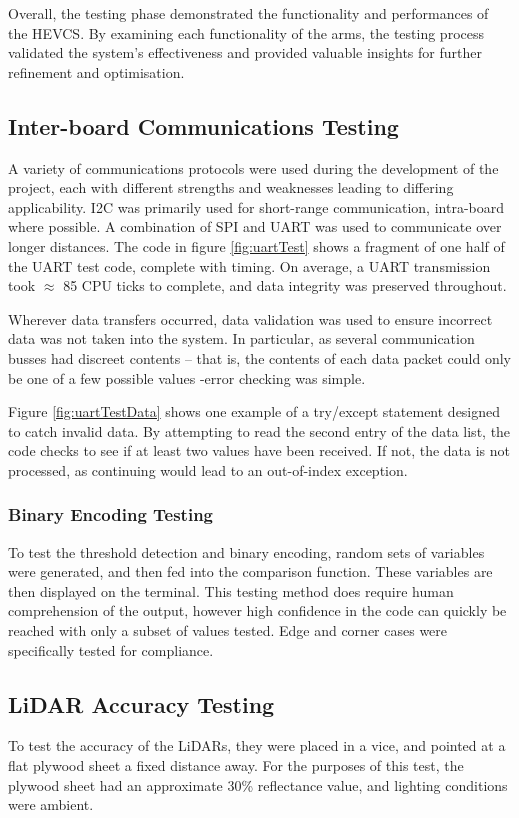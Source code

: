 \documentclass [12pt]{article}
\begin{document}
Overall, the testing phase demonstrated the functionality and performances of the HEVCS. By examining each functionality of the arms, the testing process validated the system’s effectiveness and provided valuable insights for further refinement and optimisation.


\subsection{Inter-board Communications Testing}

A variety of communications protocols were used during the development of the project, each with different strengths and weaknesses leading to differing applicability. I2C was primarily used for short-range communication, intra-board where possible. A combination of SPI and UART was used to communicate over longer distances. The code in figure \ref{fig:uartTest} shows a fragment of one half of the UART test code, complete with timing. On average, a UART transmission took $\approx$ 85 CPU ticks to complete, and data integrity was preserved throughout.

	Wherever data transfers occurred, data validation was used to ensure incorrect data was not taken into the system. In particular, as several communication busses had discreet contents – that is, the contents of each data packet could only be one of a few possible values -error checking was simple.  

Figure \ref{fig:uartTestData} shows one example of a try/except statement designed to catch invalid data. By attempting to read the second entry of the data list, the code checks to see if at least two values have been received. If not, the data is not processed, as continuing would lead to an out-of-index exception. 

\subsubsection{Binary Encoding Testing}
To test the threshold detection and binary encoding, random sets of variables were generated, and then fed into the comparison function. These variables are then displayed on the terminal. This testing method does require human comprehension of the output, however high confidence in the code can quickly be reached with only a subset of values tested. Edge and corner cases were specifically tested for compliance.

\subsection{LiDAR Accuracy Testing}
To test the accuracy of the LiDARs, they were placed in a vice, and pointed at a flat plywood sheet a fixed distance away. For the purposes of this test, the plywood sheet had an approximate 30\% reflectance value, and lighting conditions were ambient.
\end{document}
